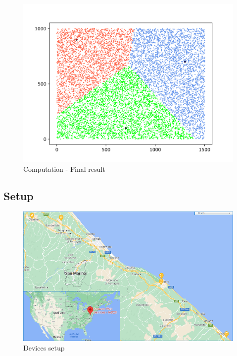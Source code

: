 \begin{figure}[!ht]
    \centering
    \includegraphics[width=\linewidth]{document/chapters/chapter_7/images/computation_final_result.png}
    \caption{Computation - Final result}
    \label{fig:computation_final_result}
\end{figure}

\subsection{Setup}

\begin{figure}[!ht]
    \centering
    \includegraphics[width=\linewidth]{document/chapters/chapter_7/images/experiment_devices_setup.png}
    \caption{Devices setup}
    \label{fig:experiment_devices_setup}
\end{figure}

